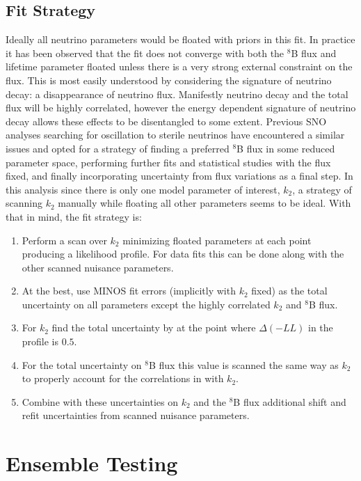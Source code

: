 \subsection{Fit Strategy}
\label{strategy}
Ideally all neutrino parameters would be floated with priors in this fit. 
In practice it has been observed that the fit does not converge with both the $^8$B flux and lifetime parameter floated unless there is a very strong external constraint on the flux.
This is most easily understood by considering the signature of neutrino decay: a disappearance of neutrino flux.
Manifestly neutrino decay and the total flux will be highly correlated, however the energy dependent signature of neutrino decay allows these effects to be disentangled to some extent.
Previous SNO analyses searching for oscillation to sterile neutrinos \cite{plthesis} have encountered a similar issues and opted for a strategy of finding a preferred $^8$B flux in some reduced parameter space, performing further fits and statistical studies with the flux fixed, and finally incorporating uncertainty from flux variations as a final step.
In this analysis since there is only one model parameter of interest, $k_2$, a strategy of scanning $k_2$ manually while floating all other parameters seems to be ideal. 
With that in mind, the fit strategy is:
\begin{enumerate}
\item Perform a scan over $k_2$ minimizing floated parameters at each point producing a likelihood profile. For data fits this can be done along with the other scanned nuisance parameters.
\item At the best, use MINOS fit errors (implicitly with $k_2$ fixed) as the total uncertainty on all parameters except the highly correlated $k_2$ and $^8$B flux.
\item For $k_2$ find the total uncertainty by at the point where $\Delta(-LL)$ in the profile is $0.5$.
\item For the total uncertainty on $^8$B flux this value is scanned the same way as $k_2$ to properly account for the correlations in with $k_2$.
\item Combine with these uncertainties on $k_2$ and the $^8$B flux additional shift and refit uncertainties from scanned nuisance parameters.
\end{enumerate}

\section{Ensemble Testing}
\label{ensemble_tests}


